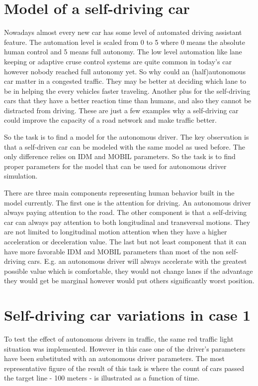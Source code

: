	\section{Model of a self-driving car}
		Nowadays almost every new car has some level of automated driving assistant feature. The automation level is scaled from 0 to 5 where 0 means the absolute human control and 5 means full autonomy. The low level automation like lane keeping or adaptive cruse control systems are quite common in today's car however nobody reached full autonomy yet. So why could an (half)autonomous car matter in a congested traffic. They may be better at deciding which lane to be in helping the every vehicles faster traveling. Another plus for the self-driving cars that they have a better reaction time than humans, and also they cannot be distracted from driving. These are just a few examples why a self-driving car could improve the capacity of a road network and make traffic better.

		So the task is to find a model for the autonomous driver. The key observation is that a self-driven car can be modeled with the same model as used before. The only difference relies on IDM and MOBIL parameters. So the task is to find proper parameters for the model that can be used for autonomous driver simulation.
	
		There are three main components representing human behavior built in the model currently. The first one is the attention for driving. An autonomous driver always paying attention to the road. The other component is that a self-driving car can always pay attention to both longitudinal and transversal motions. They are not limited to longitudinal motion attention when they have a higher acceleration or deceleration value. The last but not least component that it can have more favorable IDM and MOBIL parameters than most of the non self-driving cars. E.g. an autonomous driver will always accelerate with the greatest possible value which is comfortable, they would not change lanes if the advantage they would get be marginal however would put others significantly worst position.
	\section{Self-driving car variations in case 1}
		To test the effect of autonomous drivers in traffic, the same red traffic light situation was implemented. However in this case one of the driver's parameters have been substituted with an autonomous driver parameters. The most representative figure of the result of this task is where the count of cars passed the target line - 100 meters - is illustrated as a function of time. 
